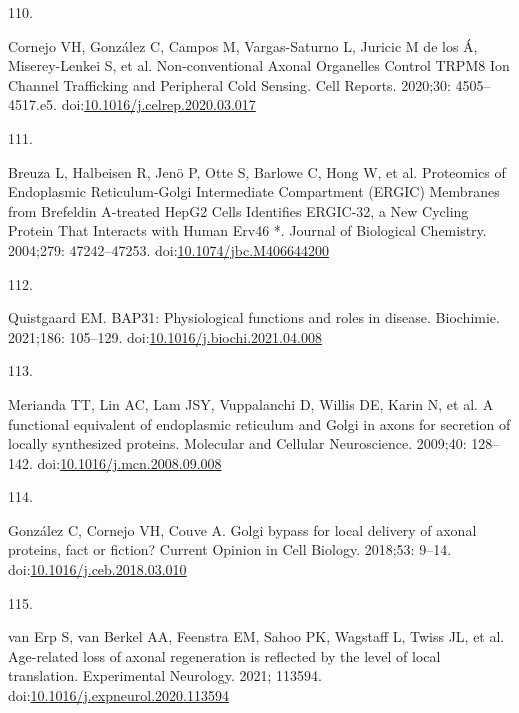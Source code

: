 \documentclass[
  12pt,
  a4paper,
]{book}
\newlength{\cslhangindent}
\newlength{\csllabelwidth}
\newlength{\cslentryspacingunit} %
\newenvironment{CSLReferences}[2] %
 {%
  \setlength{\parindent}{0pt}
  \ifodd #1
  \let\oldpar\par
  \def\par{\hangindent=\cslhangindent\oldpar}
  \fi
  \setlength{\parskip}{#2\cslentryspacingunit}
 }%
 {}
\newcommand{\CSLLeftMargin}[1]{\parbox[t]{\csllabelwidth}{#1}}
\newcommand{\CSLRightInline}[1]{\parbox[t]{\linewidth - \csllabelwidth}{#1}\break}
\begin{document}
\begin{CSLReferences}{0}{0}
\leavevmode{}%
\CSLLeftMargin{110. }%
\CSLRightInline{Cornejo VH, González C, Campos M, Vargas-Saturno L, Juricic M de los Á, Miserey-Lenkei S, et al. Non-conventional {Axonal Organelles Control TRPM8 Ion Channel Trafficking} and {Peripheral Cold Sensing}. Cell Reports. 2020;30: 4505--4517.e5. doi:\href{https://doi.org/10.1016/j.celrep.2020.03.017}{10.1016/j.celrep.2020.03.017}}

\leavevmode{}%
\CSLLeftMargin{111. }%
\CSLRightInline{Breuza L, Halbeisen R, Jenö P, Otte S, Barlowe C, Hong W, et al. Proteomics of {Endoplasmic Reticulum-Golgi Intermediate Compartment} ({ERGIC}) {Membranes} from {Brefeldin A-treated HepG2 Cells Identifies ERGIC-32}, a {New Cycling Protein That Interacts} with {Human Erv46} *. Journal of Biological Chemistry. 2004;279: 47242--47253. doi:\href{https://doi.org/10.1074/jbc.M406644200}{10.1074/jbc.M406644200}}

\leavevmode{}%
\CSLLeftMargin{112. }%
\CSLRightInline{Quistgaard EM. {BAP31}: {Physiological} functions and roles in disease. Biochimie. 2021;186: 105--129. doi:\href{https://doi.org/10.1016/j.biochi.2021.04.008}{10.1016/j.biochi.2021.04.008}}

\leavevmode{}%
\CSLLeftMargin{113. }%
\CSLRightInline{Merianda TT, Lin AC, Lam JSY, Vuppalanchi D, Willis DE, Karin N, et al. A functional equivalent of endoplasmic reticulum and {Golgi} in axons for secretion of locally synthesized proteins. Molecular and Cellular Neuroscience. 2009;40: 128--142. doi:\href{https://doi.org/10.1016/j.mcn.2008.09.008}{10.1016/j.mcn.2008.09.008}}

\leavevmode{}%
\CSLLeftMargin{114. }%
\CSLRightInline{González C, Cornejo VH, Couve A. Golgi bypass for local delivery of axonal proteins, fact or fiction? Current Opinion in Cell Biology. 2018;53: 9--14. doi:\href{https://doi.org/10.1016/j.ceb.2018.03.010}{10.1016/j.ceb.2018.03.010}}

\leavevmode{}%
\CSLLeftMargin{115. }%
\CSLRightInline{van Erp S, van Berkel AA, Feenstra EM, Sahoo PK, Wagstaff L, Twiss JL, et al. Age-related loss of axonal regeneration is reflected by the level of local translation. Experimental Neurology. 2021; 113594. doi:\href{https://doi.org/10.1016/j.expneurol.2020.113594}{10.1016/j.expneurol.2020.113594}}


\end{CSLReferences}
\end{document}
